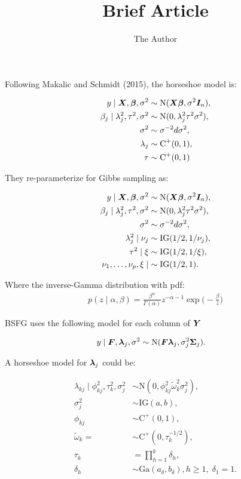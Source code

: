 \documentclass[11pt]{amsart}
\title{Brief Article}
\author{The Author}
\newcommand*{\B}[1]{\ifmmode\bm{#1}\else\textbf{#1}\fi}
\begin{document}
Following Makalic and Schmidt (2015), the horseshoe model is:

\begin{align*}
y \mid \B{X},\B{\beta},\sigma^2 &\sim \mbox{N}(\B{X\beta},\sigma^2\B{I}_n), \\
\beta_j \mid \lambda^2_j, \tau^2, \sigma^2 &\sim \mbox{N}(0,\lambda^2_j \tau^2 \sigma^2), \\
\sigma^2 &\sim \sigma^{-2}d\sigma^2, \\
\lambda_j &\sim \mbox{C}^+(0,1), \\
\tau &\sim \mbox{C}^+(0,1)
\end{align*}

They re-parameterize for Gibbs sampling as:

\begin{align*}
y \mid \B{X},\B{\beta},\sigma^2 &\sim \mbox{N}(\B{X\beta},\sigma^2\B{I}_n), \\
\beta_j \mid \lambda^2_j, \tau^2, \sigma^2 &\sim \mbox{N}(0,\lambda^2_j \tau^2 \sigma^2), \\
\sigma^2 &\sim \sigma^{-2}d\sigma^2, \\
\lambda^2_j \mid \nu_j &\sim \mbox{IG}(1/2,1/\nu_j), \\
\tau^2 \mid \xi &\sim \mbox{IG}(1/2,1/\xi), \\
\nu_1,\dots,\nu_p,\xi \mid &\sim \mbox{IG}(1/2,1).
\end{align*}

Where the inverse-Gamma distribution with pdf:
\begin{align*}
p(z \mid \alpha,\beta) = \frac{\beta^\alpha}{\Gamma(\alpha)} z^{-\alpha-1} \exp\big(-\frac{\beta}{z}\big)
\end{align*}

BSFG uses the following model for each column of $\B{Y}$

\begin{align*}
y \mid \B{F},\B{\lambda}_j,\sigma^2 &\sim \mbox{N}(\B{F}\B{\lambda}_j, \sigma^2_j\B{\Sigma}_j).
\end{align*}

A horseshoe model for $\B{\lambda}_j$ could be:

\begin{align*}
\lambda_{kj} \mid \phi^2_{kj}, \tau^2_k, \sigma^2_j &\sim \mbox{N}(0,\phi^2_{kj}\tilde{\omega}^2_k \sigma^2_j), \\
\sigma^2_j &\sim \mbox{IG}(a,b), \\
\phi_{kj} &\sim \mbox{C}^+(0,1), \\
\tilde{\omega}_k = &\sim \mbox{C}^+(0,\tau^{-1/2}_k), \\
\tau_k &= \prod\limits_{h=1}^k \delta_h, \\
\delta_h &\sim \mbox{Ga}(a_\delta,b_\delta), h \geq 1, \; \delta_1 = 1.
\end{align*}
\end{document}
